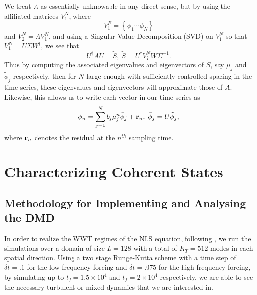 \documentclass[aps,prl,preprint,groupedaddress]{revtex4-1}
\begin{document}
We treat $A$ as essentially unknowable in any direct sense, but by using the affiliated matrices $V_{1}^{N}$, where
\[
V^{N}_{1} = \left\{\phi_{1} \cdots \phi_{N} \right\}
\]
and $V_{2}^{N} = AV_{1}^{N}$, and using a Singular Value Decomposition (SVD) on $V_{1}^{N}$ so that $V_{1}^{N} = U\Sigma W^{\dagger}$, we see that 
\[
U^{\dagger}AU = \tilde{S}, ~ \tilde{S} = U^{\dagger}V_{2}^{N}W\Sigma^{-1}.
\]
Thus by computing the associated eigenvalues and eigenvectors of $\tilde{S}$, say $\mu_{j}$ and $\tilde{\phi}_{j}$ respectively, then for $N$ large enough with sufficiently controlled spacing in the time-series, these eigenvalues and eigenvectors will approximate those of $A$.  Likewise, this allows us to write each vector in our time-series as 
\[
\phi_{n} = \sum_{j=1}^{N} b_{j}\mu_{j}^{n} \bar{\phi}_{j} + {\bf r}_{n}, ~ \bar{\phi}_{j} = U \tilde{\phi}_{j},
\]
where ${\bf r}_{n}$ denotes the residual at the $n^{th}$ sampling time. 
\section*{Characterizing Coherent States}

\subsection*{Methodology for Implementing and Analysing the DMD}

In order to realize the WWT regimes of the NLS equation, following \cite{nazarenko2}, we run the simulations over a domain of size $L=128$ with a total of $K_{T}=512$ modes in each spatial direction.  Using a two stage Runge-Kutta scheme with a time step of $\delta t=.1$ for the low-frequency forcing and $\delta t=.075$ for the high-frequency forcing, by simulating up to $t_{f}=1.5\times 10^{4}$ and $t_{f}=2\times 10^{4}$ respectively, we are able to see the necessary turbulent or mixed dynamics that we are interested in.  
\end{document}
